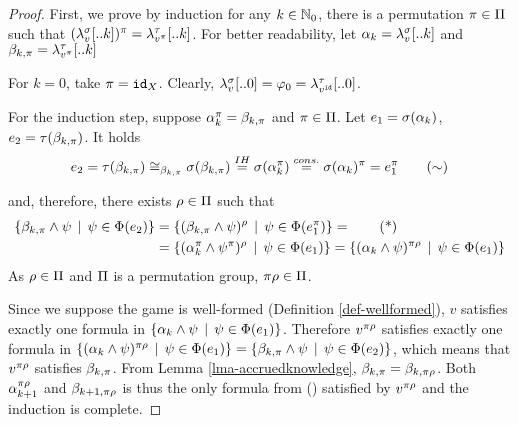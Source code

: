 \begin{proof}
First, we prove by induction for any $k\in\mathbb{N}_0$,
  there is a permutation $\pi\in \Pi$ such that
  $(\lambda^{\sigma}_{v}[..k])^\pi = \lambda^{\tau}_{v^\pi}[..k]$.
For better readability, let
  $\alpha_k = \lambda^{\sigma}_{v}[..k]$ and
  $\beta_{k, \pi} = \lambda^{\tau}_{v^\pi}[..k]$

For $k=0$, take $\pi = \mathtt{id}_X$.
Clearly, $\lambda^{\sigma}_{v}[..0] = \varphi_0 = \lambda^{\tau}_{v^{\mathtt{id}}}[..0]$.

For the induction step, suppose $\alpha_k^\pi = \beta_{k, \pi}$ and $\pi\in \Pi$.
Let $e_1 = \sigma(\alpha_k)$, $e_2 = \tau(\beta_{k, \pi})$. It holds
\begin{equation}
e_2 = \tau(\beta_{k, \pi})
    \cong_{\beta_{k, \pi}}  \sigma(\beta_{k, \pi})
    \stackrel{IH}{=} \sigma(\alpha_k^\pi)
    \stackrel{cons.}{=} \sigma(\alpha_k)^\pi
    = e_1^\pi \label{eq:expsym}\tag{$\sim$}
\end{equation}

and, therefore, there exists $\rho\in\Pi$ such that
\begin{align}
 \{ \knowx_{k, \perm} \wedge \formx \| \formx\in\outcome(\exp_2) \} &= %
 \{ (\knowx_{k, \perm} \wedge \formx)^\permx \| \formx\in\outcome(\exp_1^\perm) \} = \label{eq:sets}\tag{*}\\
&= \{ (\know_k^\perm \wedge \formx^\perm)^\permx \| \formx\in\outcome(\exp_1) \} =
 \{ (\know_k \wedge \formx)^{\perm\permx} \| \formx\in\outcome(\exp_1) \}
\end{align}
As $\rho\in\Pi$ and $\Pi$ is a permutation group, $\pi\rho\in\Pi$.

Since we suppose the game is well-formed (Definition \ref{def-wellformed}),
  $v$ satisfies exactly one formula in
  $\{ \alpha_k \wedge \psi \:\:|\:\: \psi\in\Phi(e_1) \}$.
Therefore $v^{\pi\rho}$ satisfies exactly one formula
  in
  $\{ (\alpha_k \wedge \psi)^{\pi\rho} \:\:|\:\: \psi\in\Phi(e_1) \}  =
   \{ \beta_{k, \pi} \wedge \psi \:\:|\:\: \psi\in\Phi(e_2) \}$,
  which means that $v^{\pi\rho}$ satisfies $\beta_{k, \pi}$.
From Lemma \ref{lma-accruedknowledge}, $\beta_{k, \pi} = \beta_{k, \pi\rho}$.
Both $\alpha_{k+1}^{\pi\rho}$ and $\beta_{k+1, \pi\rho}$ is thus the only
  formula from () satisfied by $v^{\pi\rho}$ and
  the induction is complete.


\end{proof}
